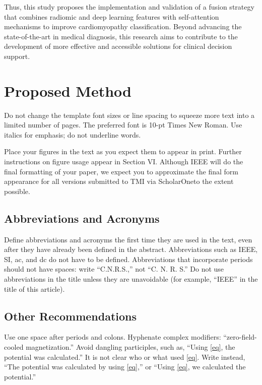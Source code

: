 \documentclass[journal,twoside,web]{ieeecolor}
\begin{document}
Thus, this study proposes the implementation and validation of a fusion strategy that combines radiomic and deep learning features with self-attention mechanisms to improve cardiomyopathy classification. Beyond advancing the state-of-the-art in medical diagnosis, this research aims to contribute to the development of more effective and accessible solutions for clinical decision support.



\section{Proposed Method}
Do not change the template font sizes or line spacing to squeeze more text into a limited number of pages.
The preferred font is 10-pt Times New Roman. Use italics for emphasis; do not underline words.

Place your figures in the text as you expect them to appear in print. Further instructions
on figure usage appear in Section VI. Although IEEE will do the final formatting of your paper,
we expect you to approximate the final form appearance for all versions
submitted to TMI via ScholarOne\textregistered to the extent possible.

\subsection{Abbreviations and Acronyms}
Define abbreviations and acronyms the first time they are used in the text, 
even after they have already been defined in the abstract. Abbreviations 
such as IEEE, SI, ac, and dc do not have to be defined. Abbreviations that 
incorporate periods should not have spaces: write ``C.N.R.S.,'' not ``C. N. 
R. S.'' Do not use abbreviations in the title unless they are unavoidable 
(for example, ``IEEE'' in the title of this article).

\subsection{Other Recommendations}
Use one space after periods and colons. Hyphenate complex modifiers: 
``zero-field-cooled magnetization.'' Avoid dangling participles, such as, 
``Using \eqref{eq}, the potential was calculated.'' It is not clear who or what 
used \eqref{eq}. Write instead, ``The potential was calculated by using \eqref{eq},'' or 
``Using \eqref{eq}, we calculated the potential.''
\end{document}
